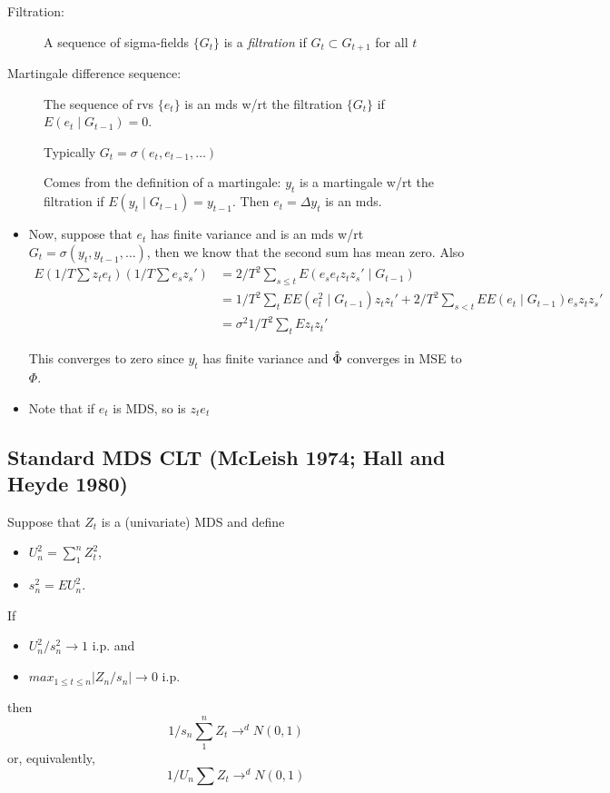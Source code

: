 \begin{description}
\item[Filtration:]
  A sequence of sigma-fields $\{G_t\}$ is a \emph{filtration} if $G_t
  ⊂ G_{t+1}$ for all $t$
\item[Martingale difference sequence:]
  The sequence of rvs $\{e_t\}$ is an mds w/rt the filtration $\{G_t\}$ if
  $E(e_t ∣ G_{t-1}) = 0$.

  Typically $G_t = \sigma(e_t, e_{t-1},\dots)$

  Comes from the definition of a martingale: $y_t$ is a martingale
  w/rt the filtration if $E(y_t ∣ G_{t-1}) = y_{t-1}$. Then $e_t =
  \Delta y_t$ is an mds.
\end{description}

\begin{itemize}
\item Now, suppose that $e_t$ has finite variance and is an mds w/rt
  $G_t = \sigma(y_t, y_{t-1},\dots)$, then we know that the second sum has mean
  zero. Also
  \begin{align*}
    E (1/T \sum z_t e_t)(1/T \sum e_s z_s')
    &= 2/T^2 \sum_{s \leq t} E(e_s e_t z_t z_s' ∣ G_{t-1}) \\
    &= 1/T^2 \sum_t E E( e_t^2 ∣ G_{t-1}) z_t z_t' + 2/T^2 \sum_{s < t} E E(
    e_t ∣ G_{t-1}) e_s z_t z_s' \\
    &= \sigma^2 1/T^2 \sum_t E z_t z_t'
  \end{align*}

  This converges to zero since $y_t$ has finite variance and $\hat{\Phi}$
  converges in MSE to $\Phi$.
\item Note that if $e_t$ is MDS, so is $z_t e_t$
\end{itemize}

\subsection{Standard MDS CLT (McLeish 1974; Hall and Heyde 1980)}

Suppose that $Z_t$ is a (univariate) MDS and define
\begin{itemize}
\item $U_n^2 = \sum_1^n Z_t^2$,
\item $s_n^2 = E U_n^2$.
\end{itemize}
If
\begin{itemize}
\item $U_n^2 / s_n^2 \to 1$ i.p. and
\item $max_{1 \leq t \leq n} |Z_n / s_n| \to 0$ i.p.
\end{itemize}
then
\[1/s_n \sum_1^n Z_t \to^d N(0, 1)\]
or, equivalently,
\[1/U_n \sum Z_t \to^d N(0, 1)\]


